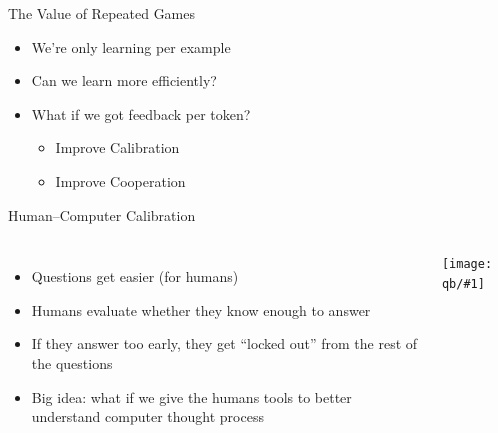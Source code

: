 \documentclass[compress]{beamer}
\newcommand{\gfxq}[2]{
\begin{center}
	\texttt{[image: qb/\#1]}
\end{center}
}
\begin{document}
\begin{frame}{The Value of Repeated Games}

  \begin{itemize}
  \item We're only learning per example
  \item Can we learn more efficiently?
  \item What if we got feedback per token?
    \pause
    \begin{itemize}
      \item Improve Calibration
      \item Improve Cooperation
    \end{itemize}
  \end{itemize}

\end{frame}

\begin{frame}{Human--Computer Calibration}
	\begin{columns}
		\begin{itemize}
			\item Questions get easier
			(for humans)
			\item Humans evaluate whether they know enough to answer
			\item If they answer too early, they get “locked out” from the rest of the questions
			\item Big idea: what if we give the humans tools to better understand computer thought process
			
		\end{itemize}
		
		\gfxq{example_game}{1.0}
	\end{columns}
	
\end{frame}
\end{document}

